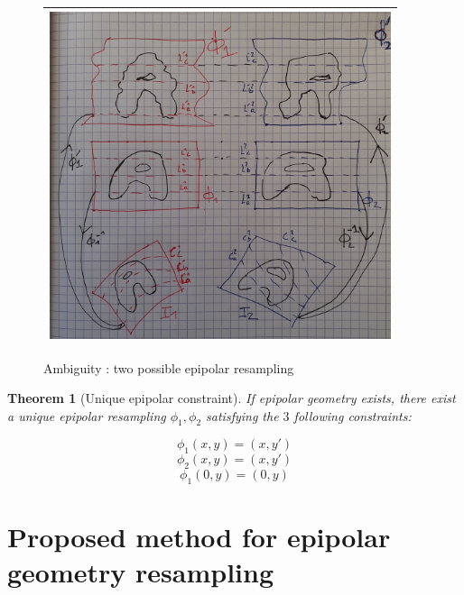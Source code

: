 \documentclass{ipol}
\newtheorem{theorem}{Theorem}
\begin{document}
\begin{figure}
\centering
\begin{tabular}{||c||}
 \hline \hline
\includegraphics[width=10cm]{FIGS/AmbigEpip.jpg}
 \\ \hline \hline
\end{tabular}
\caption{Ambiguity : two possible epipolar resampling}
\label{FigAmbigEpip}
\end{figure}




\begin{theorem}[Unique epipolar constraint]

If epipolar geometry exists, there exist a unique epipolar resampling $\phi_1,\phi_2$ satisfying the $3$ following constraints:

\begin{equation}
    \phi_1(x,y) = (x,y') \label{Ambig:PhiO}
\end{equation}
\begin{equation}
    \phi_2(x,y) = (x,y') \label{Ambig:PhiT}
\end{equation}
\begin{equation}
    \phi_1(0,y) = (0,y) \label{Ambig:Line}
\end{equation}
\label{Theo:Fix:Ambig}

\end{theorem}




\section{Proposed method for epipolar geometry resampling}
\end{document}
